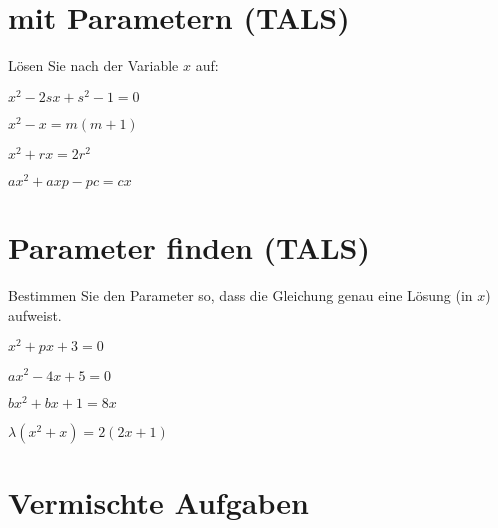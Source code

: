\section{mit Parametern (TALS)}
Lösen Sie nach der Variable $x$ auf:

\begin{bbwAufgabenBlock}
\item $ x^2 - 2sx + s^2 -1 = 0$

\item $ x^2 - x= m(m+1)$

\item $ x^2 + rx = 2r^2 $

\item $ ax^2 + axp - pc = cx$


\end{bbwAufgabenBlock}
\newpage
\section{Parameter finden (TALS)}
Bestimmen Sie den Parameter so, dass die Gleichung genau eine Lösung
(in $x$) aufweist.

\begin{bbwAufgabenBlock}
\item $ x^2 + px + 3= 0$

\item $ ax^2 - 4x + 5= 0$

\item $bx^2 + bx + 1 =8x $

\item $ \lambda (x^2+x)=2(2x+1) $


\end{bbwAufgabenBlock}
\newpage
\section{Vermischte Aufgaben}

